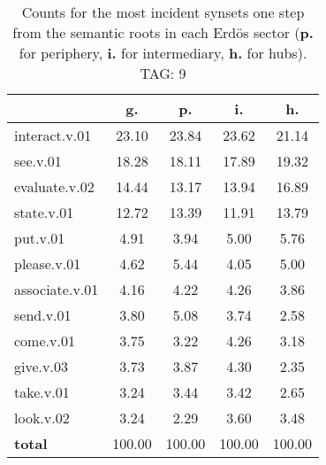 \begin{table}[h!]
\begin{center}
\begin{tabular}{| l || c | c | c | c |}\hline
 & {\bf g.} & {\bf p.} & {\bf i.} & {\bf h.} \\\hline\hline
interact.v.01 & 23.10  & 23.84  & 23.62  & 21.14 \\\hline
see.v.01 & 18.28  & 18.11  & 17.89  & 19.32 \\\hline
evaluate.v.02 & 14.44  & 13.17  & 13.94  & 16.89 \\\hline
state.v.01 & 12.72  & 13.39  & 11.91  & 13.79 \\\hline
put.v.01 & 4.91  & 3.94  & 5.00  & 5.76 \\\hline
please.v.01 & 4.62  & 5.44  & 4.05  & 5.00 \\\hline
associate.v.01 & 4.16  & 4.22  & 4.26  & 3.86 \\\hline
send.v.01 & 3.80  & 5.08  & 3.74  & 2.58 \\\hline
come.v.01 & 3.75  & 3.22  & 4.26  & 3.18 \\\hline
give.v.03 & 3.73  & 3.87  & 4.30  & 2.35 \\\hline
take.v.01 & 3.24  & 3.44  & 3.42  & 2.65 \\\hline
look.v.02 & 3.24  & 2.29  & 3.60  & 3.48 \\\hline\hline
{{\bf total}} & 100.00  & 100.00  & 100.00  & 100.00 \\\hline
\end{tabular}
\caption{Counts for the most incident synsets one step from the semantic roots in each Erd\"os sector ({\bf p.} for periphery, {\bf i.} for intermediary, {\bf h.} for hubs). TAG: 9}
\end{center}
\end{table}
